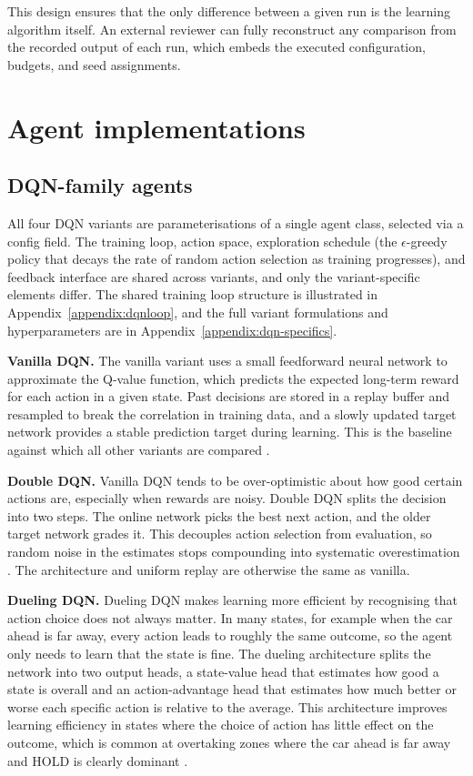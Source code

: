 This design ensures that the only difference between a given run is the learning algorithm itself. An external reviewer can fully reconstruct any comparison from the recorded output of each run, which embeds the executed configuration, budgets, and seed assignments.

\section{Agent implementations}

\subsection{DQN-family agents}
\label{sec:dqn-variants}

All four DQN variants are parameterisations of a single agent class, selected via a config field. The training loop, action space, exploration schedule (the $\epsilon$-greedy policy that decays the rate of random action selection as training progresses), and feedback interface are shared across variants, and only the variant-specific elements differ. The shared training loop structure is illustrated in Appendix~\ref{appendix:dqnloop}, and the full variant formulations and hyperparameters are in Appendix~\ref{appendix:dqn-specifics}.

\textbf{Vanilla DQN.} The vanilla variant uses a small feedforward neural network to approximate the Q-value function, which predicts the expected long-term reward for each action in a given state. Past decisions are stored in a replay buffer and resampled to break the correlation in training data, and a slowly updated target network provides a stable prediction target during learning. This is the baseline against which all other variants are compared \citep{mnih2015human}.

\textbf{Double DQN.} Vanilla DQN tends to be over-optimistic about how good certain actions are, especially when rewards are noisy. Double DQN splits the decision into two steps. The online network picks the best next action, and the older target network grades it. This decouples action selection from evaluation, so random noise in the estimates stops compounding into systematic overestimation \citep{vanhasselt2016double}. The architecture and uniform replay are otherwise the same as vanilla.

\textbf{Dueling DQN.} Dueling DQN makes learning more efficient by recognising that action choice does not always matter. In many states, for example when the car ahead is far away, every action leads to roughly the same outcome, so the agent only needs to learn that the state is fine. The dueling architecture splits the network into two output heads, a state-value head that estimates how good a state is overall and an action-advantage head that estimates how much better or worse each specific action is relative to the average. This architecture improves learning efficiency in states where the choice of action has little effect on the outcome, which is common at overtaking zones where the car ahead is far away and \textsc{HOLD} is clearly dominant \citep{wang2016dueling}.

